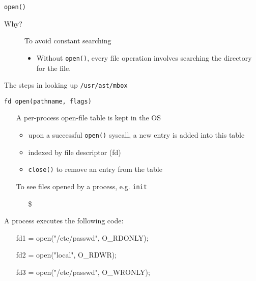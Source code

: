 \begin{frame}{\texttt{open()}}
  \begin{description}
    \item[Why?] To avoid constant searching
    \begin{itemize}
    \item Without \texttt{open()}, every file operation involves searching the directory for
      the file.
    \end{itemize}
  \end{description}
  The steps in looking up \texttt{/usr/ast/mbox}
  \begin{center}\label{fig:dir-lookup}
    \mode<beamer>{ \texttt{[image: 04-35]} }%
  \end{center}
\end{frame}

\begin{frame}
  \begin{block}{\texttt{fd open(pathname, flags)}}
    \begin{itemize}
    \item[] A per-process \alert{open-file table} is kept in the OS
      \begin{itemize}
      \item upon a successful \texttt{open()} syscall, a new entry is added into this table
      \item indexed by \alert{file descriptor (fd)}
      \item \texttt{close()} to remove an entry from the table
      \end{itemize}
    \item[] To see files opened by a process, e.g. \texttt{init}
      \begin{itemize}
      \item[\$] 
      \end{itemize}
    \end{itemize}
  \end{block}
    \qquad{}
\end{frame}

\begin{frame}
  \begin{block}{A process executes the following code:}\ttfamily
    \begin{itemize}
    \item[] fd1 = open("/etc/passwd", O\_RDONLY);
    \item[] fd2 = open("local", O\_RDWR);
    \item[] fd3 = open("/etc/passwd", O\_WRONLY);
    \end{itemize}
  \end{block}
  \begin{center}
  \end{center}
\end{frame}

